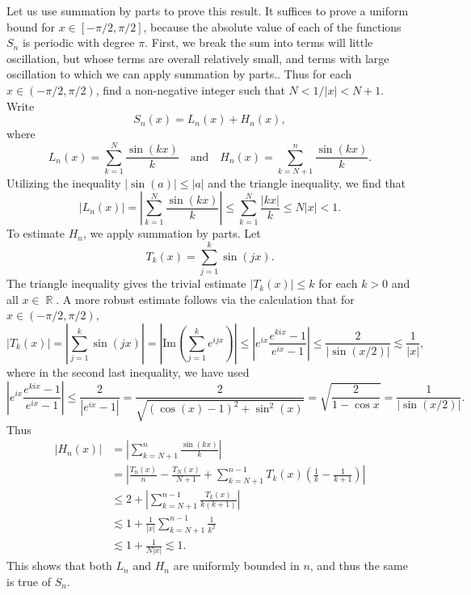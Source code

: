 \documentclass[answers]{exam}
\DeclareMathOperator{\RR}{\mathbb{R}}
\begin{document}
\begin{questions}
\begin{solution}
Let us use summation by parts to prove this result. It suffices to prove a uniform bound for $x \in [-\pi/2,\pi/2]$, because the absolute value of each of the functions $S_n$ is periodic with degree $\pi$. First, we break the sum into terms will little oscillation, but whose terms are overall relatively small, and terms with large oscillation to which we can apply summation by parts.. Thus for each $x \in (-\pi/2,\pi/2)$, find a non-negative integer such that $N < 1/|x| < N+1$. Write
%
\[ S_n(x) = L_n(x) + H_n(x), \]
%
where
%
\[ L_n(x) = \sum_{k = 1}^N \frac{\sin(kx)}{k} \quad\text{and}\quad H_n(x) = \sum_{k = N+1}^n \frac{\sin(kx)}{k}. \]
%
Utilizing the inequality $|\sin(a)| \leq |a|$ and the triangle inequality, we find that
%
\begin{equation*}
  |L_n(x)| = \left| \sum_{k=1}^{N}\frac{\sin(kx)}{k} \right|\leq \sum_{k=1}^{N}\frac{|kx|}{k}\leq N|x|<1.
\end{equation*}
%
To estimate $H_n$, we apply summation by parts. Let
%
\[ T_k(x) = \sum_{j = 1}^k \sin(jx). \]
%
The triangle inequality gives the trivial estimate $|T_k(x)| \leq k$ for each $k > 0$ and all $x \in \RR$. A more robust estimate follows via the calculation that for $x \in (-\pi/2,\pi/2)$,
%
\begin{equation*}
  |T_k(x)| = \left| \sum_{j=1}^{k}\sin(jx) \right| = \left| \text{Im} \left( \sum_{j=1}^{k}e^{ijx} \right) \right|\leq \left| e^{ix} \frac{ e^{kix} - 1}{e^{ix} - 1}\right| \leq \frac{2}{|\sin (x/2)|} \lesssim \frac{1}{|x|},
\end{equation*}
%
where in the second last inequality, we have used
%
\begin{equation*}
  \left| e^{ix}\frac{e^{kix}-1}{e^{ix}-1} \right|
  \leq \frac{2}{\left| e^{ix}-1 \right|}
  = \frac{2}{\sqrt{( \cos(x)-1 )^{2}+ \sin^{2}(x)}}
  = \sqrt{\frac{2}{1-\cos x}}
  = \frac{1}{|\sin (x/2)|}.
\end{equation*}
%
Thus
%
\begin{align*}
  |H_n(x)| &= \left| \sum_{k=N+1}^{n}\frac{\sin(kx)}{k} \right|\\
          &= \left| \frac{T_n(x)}{n}-\frac{T_N(x)}{N+1} + \sum_{k=N+1}^{n-1}T_k(x) \left(\frac{1}{k}-\frac{1}{k+1}  \right) \right|\\
         &\leq 2 + \left| \sum_{k=N+1}^{n-1}\frac{T_k(x)}{k(k+1)} \right|\\
         &\lesssim 1 + \frac{1}{|x|} \sum_{k = N+1}^{n-1} \frac{1}{k^2}\\
         &\lesssim 1 + \frac{1}{N |x|} \lesssim 1.
\end{align*}
%
This shows that both $L_n$ and $H_n$ are uniformly bounded in $n$, and thus the same is true of $S_n$.


\end{solution}
\end{questions}
\end{document}
